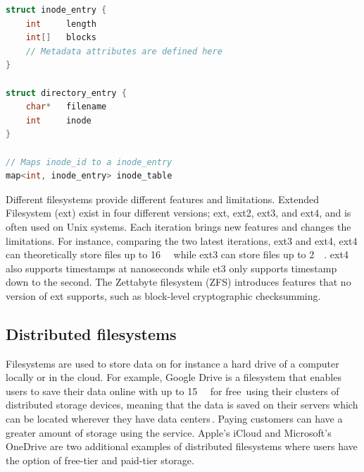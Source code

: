 \begin{minipage}{\linewidth}
\begin{lstlisting}[language=c, caption={Pseudocode of a minimalistic inode filesystem structure}, label=lst:inode_fs]
struct inode_entry {
	int 	length
	int[]	blocks
	// Metadata attributes are defined here
}

struct directory_entry {
	char*   filename
	int     inode
}

// Maps inode_id to a inode_entry
map<int, inode_entry> inode_table

\end{lstlisting}
\end{minipage}

Different filesystems provide different features and limitations. Extended Filesystem (ext) exist in four different versions; ext, ext2, ext3, and ext4, and is often used on Unix systems. Each iteration brings new features and changes the limitations. For instance, comparing the two latest iterations, ext3 and ext4, ext4 can theoretically store files up to \SI{16}{\tebi\byte} while ext3 can store files up to \SI{2}{\tebi\byte}\cite{salterUnderstandingLinuxFilesystems2018}. ext4 also supports timestamps at nanoseconds while et3 only supports timestamp down to the second. The Zettabyte filesystem (ZFS) introduces features that no version of ext supports, such as block-level cryptographic checksumming.

\subsection{Distributed filesystems}
Filesystems are used to store data on for instance a hard drive of a computer locally or in the cloud. For example, Google Drive is a filesystem that enables users to save their data online with up to \SI{15}{\giga\byte} for free\,\cite{CloudStorageWork} using their clusters of distributed storage devices, meaning that the data is saved on their servers which can be located wherever they have data centers\,\cite{DistributedStorageWhat}. Paying customers can have a greater amount of storage using the service. Apple's iCloud and Microsoft's OneDrive are two additional examples of distributed filesystems where users have the option of free-tier and paid-tier storage.

